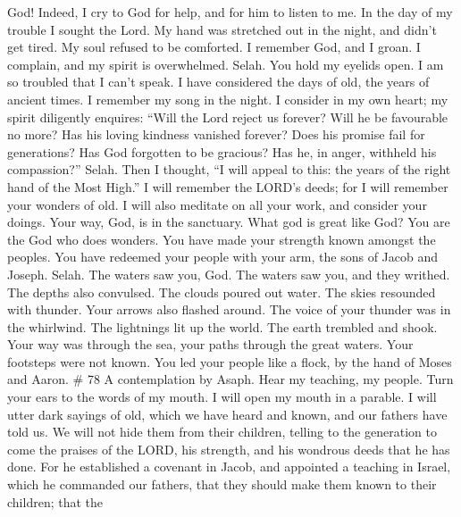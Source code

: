 God! Indeed, I cry to God for help, and for him to listen to me.
 In the day of my trouble I sought the Lord. My hand was
stretched out in the night, and didn't get tired. My soul refused to be
comforted.  I remember God, and I groan. I complain, and
my spirit is overwhelmed. Selah.  You hold my eyelids
open. I am so troubled that I can't speak.  I have
considered the days of old, the years of ancient times.  I
remember my song in the night. I consider in my own heart; my spirit
diligently enquires:  ``Will the Lord reject us forever?
Will he be favourable no more?  Has his loving kindness
vanished forever? Does his promise fail for generations? 
Has God forgotten to be gracious? Has he, in anger, withheld his
compassion?'' Selah.  Then I thought, ``I will appeal to
this: the years of the right hand of the Most High.''  I
will remember the LORD's deeds; for I will remember your wonders of old.
 I will also meditate on all your work, and consider your
doings.  Your way, God, is in the sanctuary. What god is
great like God?  You are the God who does wonders. You
have made your strength known amongst the peoples.  You
have redeemed your people with your arm, the sons of Jacob and Joseph.
Selah.  The waters saw you, God. The waters saw you, and
they writhed. The depths also convulsed.  The clouds
poured out water. The skies resounded with thunder. Your arrows also
flashed around.  The voice of your thunder was in the
whirlwind. The lightnings lit up the world. The earth trembled and
shook.  Your way was through the sea, your paths through
the great waters. Your footsteps were not known.  You led
your people like a flock, by the hand of Moses and Aaron. \# 78 A
contemplation by Asaph.  Hear my teaching, my people. Turn
your ears to the words of my mouth.  I will open my mouth
in a parable. I will utter dark sayings of old,  which we
have heard and known, and our fathers have told us.  We
will not hide them from their children, telling to the generation to
come the praises of the LORD, his strength, and his wondrous deeds that
he has done.  For he established a covenant in Jacob, and
appointed a teaching in Israel, which he commanded our fathers, that
they should make them known to their children;  that the
